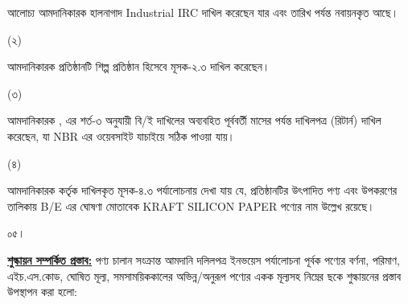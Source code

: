 \documentclass[12pt]{article}
\newcommand{\product}{}
\newcommand{\good}{KRAFT SILICON PAPER}
\newcommand{\ircno}{}
\newcommand{\ircrenewdt}{}
\newcommand{\musokr}{}
\begin{document}
\begin{minipage}[t]{0.90\linewidth}
আলোচ্য আমদানিকারক হালনাগাদ Industrial IRC
দাখিল করেছেন যার {\ircno} এবং
{\ircrenewdt} তারিখ পর্যন্ত নবায়নকৃত আছে।
\end{minipage}
\begin{minipage}[t]{0.05\linewidth}
\hspace{0em}
\end{minipage}
\begin{minipage}[t]{0.05\linewidth}
(২)
\end{minipage}
\begin{minipage}[t]{0.90\linewidth}
আমদানিকারক প্রতিষ্ঠানটি শিল্প প্রতিষ্ঠান হিসেবে
মূসক-২.৩ দাখিল করেছেন।
\end{minipage}
\begin{minipage}[t]{0.05\linewidth}
\hspace{0em}
\end{minipage}
\begin{minipage}[t]{0.05\linewidth}
(৩)
\end{minipage}
\begin{minipage}[t]{0.90\linewidth}
আমদানিকারক {\srooof}, {\srooofd} এর
শর্ত-৩ অনুযায়ী বি/ই দাখিলের অব্যবহিত
পূর্ববর্তী মাসের {\musokr} পর্যন্ত দাখিলপত্র
(রিটার্ন) দাখিল করেছেন, যা NBR এর ওয়েবসাইট
যাচাইয়ে সঠিক পাওয়া যায়।
\end{minipage}
\begin{minipage}[t]{0.05\linewidth}
\hspace{0em}
\end{minipage}
\begin{minipage}[t]{0.05\linewidth}
(৪)
\end{minipage}
\begin{minipage}[t]{0.90\linewidth}
আমদানিকারক কর্তৃক দাখিলকৃত মূসক-৪.৩
পর্যালোচনায় দেখা যায় যে, প্রতিষ্ঠানটির উৎপাদিত
পণ্য {\product} এবং উপকরণের তালিকায়
B/E এর ঘোষণা মোতাবেক {\good} পণ্যের নাম
উল্লেখ রয়েছে।
\\
\end{minipage}
\begin{minipage}[t]{0.05\linewidth}
০৫।
\end{minipage}
\begin{minipage}[t]{0.95\linewidth}
\underline{\textbf{শুল্কায়ন সম্পর্কিত প্রস্তাব:}}
পণ্য চালান সংক্রান্ত আমদানি দলিলপত্র
ইনভয়েস পর্যালোচনা পূর্বক পণ্যের বর্ণনা, পরিমাণ, এইচ.এস.কোড, ঘোষিত মূল্য,
সমসাময়িককালের অভিন্ন/অনুরূপ পণ্যের একক মূল্যসহ নিম্নের ছকে শুল্কায়নের প্রস্তাব উপস্থাপন
করা হলো:
\end{minipage}
\end{document}

